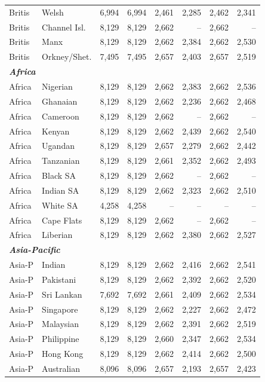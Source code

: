 \begin{table}[t]
\begin{tabular}{llrrrrrr}
Britis & Welsh & 6,994 & 6,994 & 2,461 & 2,285 & 2,462 & 2,341 \\
Britis & Channel Isl. & 8,129 & 8,129 & 2,662 & -- & 2,662 & -- \\
Britis & Manx & 8,129 & 8,129 & 2,662 & 2,384 & 2,662 & 2,530 \\
Britis & Orkney/Shet. & 7,495 & 7,495 & 2,657 & 2,403 & 2,657 & 2,519 \\
\midrule
\multicolumn{8}{l}{\textit{\textbf{Africa}}} \\
Africa & Nigerian & 8,129 & 8,129 & 2,662 & 2,383 & 2,662 & 2,536 \\
Africa & Ghanaian & 8,129 & 8,129 & 2,662 & 2,236 & 2,662 & 2,468 \\
Africa & Cameroon & 8,129 & 8,129 & 2,662 & -- & 2,662 & -- \\
Africa & Kenyan & 8,129 & 8,129 & 2,662 & 2,439 & 2,662 & 2,540 \\
Africa & Ugandan & 8,129 & 8,129 & 2,657 & 2,279 & 2,662 & 2,442 \\
Africa & Tanzanian & 8,129 & 8,129 & 2,661 & 2,352 & 2,662 & 2,493 \\
Africa & Black SA & 8,129 & 8,129 & 2,662 & -- & 2,662 & -- \\
Africa & Indian SA & 8,129 & 8,129 & 2,662 & 2,323 & 2,662 & 2,510 \\
Africa & White SA & 4,258 & 4,258 & -- & -- & -- & -- \\
Africa & Cape Flats & 8,129 & 8,129 & 2,662 & -- & 2,662 & -- \\
Africa & Liberian & 8,129 & 8,129 & 2,662 & 2,380 & 2,662 & 2,527 \\
\midrule
\multicolumn{8}{l}{\textit{\textbf{Asia-Pacific}}} \\
Asia-P & Indian & 8,129 & 8,129 & 2,662 & 2,416 & 2,662 & 2,541 \\
Asia-P & Pakistani & 8,129 & 8,129 & 2,662 & 2,392 & 2,662 & 2,520 \\
Asia-P & Sri Lankan & 7,692 & 7,692 & 2,661 & 2,409 & 2,662 & 2,534 \\
Asia-P & Singapore & 8,129 & 8,129 & 2,662 & 2,227 & 2,662 & 2,472 \\
Asia-P & Malaysian & 8,129 & 8,129 & 2,662 & 2,391 & 2,662 & 2,519 \\
Asia-P & Philippine & 8,129 & 8,129 & 2,660 & 2,347 & 2,662 & 2,534 \\
Asia-P & Hong Kong & 8,129 & 8,129 & 2,662 & 2,414 & 2,662 & 2,500 \\
Asia-P & Australian & 8,096 & 8,096 & 2,657 & 2,193 & 2,657 & 2,423 \\

\end{tabular}
\end{table}

